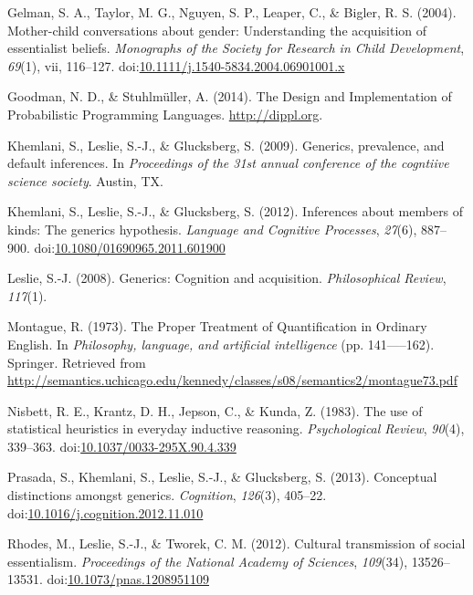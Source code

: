 \documentclass[floatsintext,man]{apa6}
\theoremstyle{definition}
\theoremstyle{definition}
\theoremstyle{definition}
\theoremstyle{remark}
\begin{document}
\hypertarget{ref-GelmanEtAl2004}{}
Gelman, S. A., Taylor, M. G., Nguyen, S. P., Leaper, C., \& Bigler, R.
S. (2004). Mother-child conversations about gender: Understanding the
acquisition of essentialist beliefs. \emph{Monographs of the Society for
Research in Child Development}, \emph{69}(1), vii, 116--127.
doi:\href{https://doi.org/10.1111/j.1540-5834.2004.06901001.x}{10.1111/j.1540-5834.2004.06901001.x}

\hypertarget{ref-dippl}{}
Goodman, N. D., \& Stuhlmüller, A. (2014). The Design and Implementation
of Probabilistic Programming Languages. \url{http://dippl.org}.

\hypertarget{ref-Khemlani2009}{}
Khemlani, S., Leslie, S.-J., \& Glucksberg, S. (2009). Generics,
prevalence, and default inferences. In \emph{Proceedings of the 31st
annual conference of the cogntiive science society}. Austin, TX.

\hypertarget{ref-Khemlani2012}{}
Khemlani, S., Leslie, S.-J., \& Glucksberg, S. (2012). Inferences about
members of kinds: The generics hypothesis. \emph{Language and Cognitive
Processes}, \emph{27}(6), 887--900.
doi:\href{https://doi.org/10.1080/01690965.2011.601900}{10.1080/01690965.2011.601900}

\hypertarget{ref-Leslie2008}{}
Leslie, S.-J. (2008). Generics: Cognition and acquisition.
\emph{Philosophical Review}, \emph{117}(1).

\hypertarget{ref-Montague1973}{}
Montague, R. (1973). The Proper Treatment of Quantification in Ordinary
English. In \emph{Philosophy, language, and artificial intelligence}
(pp. 141-----162). Springer. Retrieved from
\url{http://semantics.uchicago.edu/kennedy/classes/s08/semantics2/montague73.pdf}

\hypertarget{ref-Nisbett1983}{}
Nisbett, R. E., Krantz, D. H., Jepson, C., \& Kunda, Z. (1983). The use
of statistical heuristics in everyday inductive reasoning.
\emph{Psychological Review}, \emph{90}(4), 339--363.
doi:\href{https://doi.org/10.1037/0033-295X.90.4.339}{10.1037/0033-295X.90.4.339}

\hypertarget{ref-Prasada2013}{}
Prasada, S., Khemlani, S., Leslie, S.-J., \& Glucksberg, S. (2013).
Conceptual distinctions amongst generics. \emph{Cognition},
\emph{126}(3), 405--22.
doi:\href{https://doi.org/10.1016/j.cognition.2012.11.010}{10.1016/j.cognition.2012.11.010}

\hypertarget{ref-Rhodes2012}{}
Rhodes, M., Leslie, S.-J., \& Tworek, C. M. (2012). Cultural
transmission of social essentialism. \emph{Proceedings of the National
Academy of Sciences}, \emph{109}(34), 13526--13531.
doi:\href{https://doi.org/10.1073/pnas.1208951109}{10.1073/pnas.1208951109}
\end{document}
